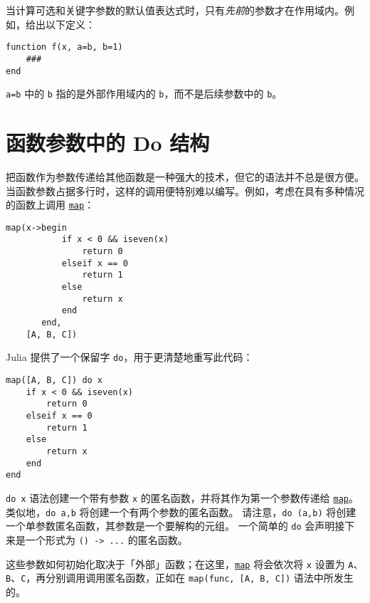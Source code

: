 当计算可选和关键字参数的默认值表达式时，只有\emph{先前}的参数才在作用域内。例如，给出以下定义：




\begin{verbatim}
function f(x, a=b, b=1)
    ###
end
\end{verbatim}



\texttt{a=b} 中的 \texttt{b} 指的是外部作用域内的 \texttt{b}，而不是后续参数中的 \texttt{b}。



\hypertarget{1892968097837414739}{}


\section{函数参数中的 Do 结构}



把函数作为参数传递给其他函数是一种强大的技术，但它的语法并不总是很方便。当函数参数占据多行时，这样的调用便特别难以编写。例如，考虑在具有多种情况的函数上调用 \hyperlink{11483231213869150535}{\texttt{map}}：




\begin{verbatim}
map(x->begin
           if x < 0 && iseven(x)
               return 0
           elseif x == 0
               return 1
           else
               return x
           end
       end,
    [A, B, C])
\end{verbatim}



Julia 提供了一个保留字 \texttt{do}，用于更清楚地重写此代码：




\begin{verbatim}
map([A, B, C]) do x
    if x < 0 && iseven(x)
        return 0
    elseif x == 0
        return 1
    else
        return x
    end
end
\end{verbatim}



\texttt{do x} 语法创建一个带有参数 \texttt{x} 的匿名函数，并将其作为第一个参数传递给 \hyperlink{11483231213869150535}{\texttt{map}}。 类似地，\texttt{do a,b} 将创建一个有两个参数的匿名函数。 请注意，\texttt{do (a,b)} 将创建一个单参数匿名函数，其参数是一个要解构的元组。 一个简单的 \texttt{do} 会声明接下来是一个形式为 \texttt{() -> ...} 的匿名函数。



这些参数如何初始化取决于「外部」函数；在这里，\hyperlink{11483231213869150535}{\texttt{map}} 将会依次将 \texttt{x} 设置为 \texttt{A}、\texttt{B}、\texttt{C}，再分别调用调用匿名函数，正如在 \texttt{map(func, [A, B, C])} 语法中所发生的。



